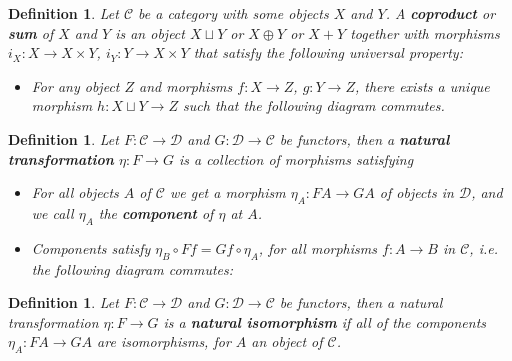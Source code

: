 \documentclass[11pt]{report}
\newcommand{\mcC}{\mathcal{C}}
\newcommand{\mcD}{\mathcal{D}}
\newtheorem{defn}[thm]{Definition} %
\begin{document}
\begin{defn}
  Let $\mcC$ be a category with some objects $X$ and $Y$. A \textbf{coproduct} or \textbf{sum} of $X$ and $Y$ is an object $X \sqcup Y$ or $X \oplus Y$ or $X + Y$
  together with morphisms $i _X: X \to X \times Y$, $i_Y: Y \to X \times Y$ that satisfy the following universal property:
  \begin{itemize}
    \item For any object $Z$ and morphisms $f: X \to Z$, $g: Y \to Z$, there exists a unique morphism $h: X \sqcup Y \to Z$ such that the following diagram commutes.
    \begin{center}
    \end{center}
  \end{itemize}
\end{defn}


\begin{defn}
  Let $F: \mcC \to \mcD$ and $G: \mcD \to \mcC$ be functors, then a \textbf{natural transformation} $\eta: F \to G$ is a collection of morphisms satisfying
  \begin{itemize}
    \item For all objects $A$ of $\mcC$ we get a morphism $\eta_A: FA \to GA$ of objects in $\mcD$, and we call $\eta_A$ the \textbf{component }of $\eta$ at $A$. \\
    \item Components satisfy $\eta_B \circ Ff = Gf \circ \eta_A$, for all morphisms $f: A \to B$ in $\mcC$,
      i.e. the following diagram commutes:
      \begin{center}
      \end{center}

  \end{itemize}
\end{defn}

\begin{defn}
Let $F: \mcC \to \mcD$ and $G: \mcD \to \mcC$ be functors, then a natural transformation $\eta: F \to G$ is a \textbf{natural isomorphism} if all of the components $\eta_A:FA \to GA$ are isomorphisms, for $A$ an object of $\mcC$.
\end{defn}
\end{document}
